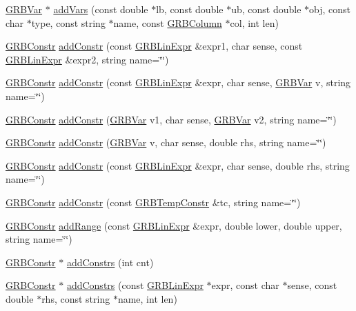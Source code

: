 \begin{DoxyCompactItemize}
\hyperlink{classGRBVar}{G\+R\+B\+Var} $\ast$ \hyperlink{classGRBModel_af8a3a9fc35892c314be155e243601192}{add\+Vars} (const double $\ast$lb, const double $\ast$ub, const double $\ast$obj, const char $\ast$type, const string $\ast$name, const \hyperlink{classGRBColumn}{G\+R\+B\+Column} $\ast$col, int len)
\item 
\hyperlink{classGRBConstr}{G\+R\+B\+Constr} \hyperlink{classGRBModel_a95e9bc35355e800ebdf87ba618153d27}{add\+Constr} (const \hyperlink{classGRBLinExpr}{G\+R\+B\+Lin\+Expr} \&expr1, char sense, const \hyperlink{classGRBLinExpr}{G\+R\+B\+Lin\+Expr} \&expr2, string name=\char`\"{}\char`\"{})
\item 
\hyperlink{classGRBConstr}{G\+R\+B\+Constr} \hyperlink{classGRBModel_a3605e2d163ba6ca2fc31586874b057f3}{add\+Constr} (const \hyperlink{classGRBLinExpr}{G\+R\+B\+Lin\+Expr} \&expr, char sense, \hyperlink{classGRBVar}{G\+R\+B\+Var} v, string name=\char`\"{}\char`\"{})
\item 
\hyperlink{classGRBConstr}{G\+R\+B\+Constr} \hyperlink{classGRBModel_a245f9547c916fa83d65e91863c5f10cd}{add\+Constr} (\hyperlink{classGRBVar}{G\+R\+B\+Var} v1, char sense, \hyperlink{classGRBVar}{G\+R\+B\+Var} v2, string name=\char`\"{}\char`\"{})
\item 
\hyperlink{classGRBConstr}{G\+R\+B\+Constr} \hyperlink{classGRBModel_abb54387d2110a52ad5bbe14c92c0f077}{add\+Constr} (\hyperlink{classGRBVar}{G\+R\+B\+Var} v, char sense, double rhs, string name=\char`\"{}\char`\"{})
\item 
\hyperlink{classGRBConstr}{G\+R\+B\+Constr} \hyperlink{classGRBModel_a3bba6ea074b2b285092f965adc4ade63}{add\+Constr} (const \hyperlink{classGRBLinExpr}{G\+R\+B\+Lin\+Expr} \&expr, char sense, double rhs, string name=\char`\"{}\char`\"{})
\item 
\hyperlink{classGRBConstr}{G\+R\+B\+Constr} \hyperlink{classGRBModel_ab5db9d63232f37b13834e0fbd5ea665c}{add\+Constr} (const \hyperlink{classGRBTempConstr}{G\+R\+B\+Temp\+Constr} \&tc, string name=\char`\"{}\char`\"{})
\item 
\hyperlink{classGRBConstr}{G\+R\+B\+Constr} \hyperlink{classGRBModel_a8d7c5b467a6f17c130a5c51a33051d08}{add\+Range} (const \hyperlink{classGRBLinExpr}{G\+R\+B\+Lin\+Expr} \&expr, double lower, double upper, string name=\char`\"{}\char`\"{})
\item 
\hyperlink{classGRBConstr}{G\+R\+B\+Constr} $\ast$ \hyperlink{classGRBModel_a648968e99d4f92774f28fea67719b393}{add\+Constrs} (int cnt)
\item 
\hyperlink{classGRBConstr}{G\+R\+B\+Constr} $\ast$ \hyperlink{classGRBModel_a89c52e6cbb11932bafd3a79dfee7d6bd}{add\+Constrs} (const \hyperlink{classGRBLinExpr}{G\+R\+B\+Lin\+Expr} $\ast$expr, const char $\ast$sense, const double $\ast$rhs, const string $\ast$name, int len)

\end{DoxyCompactItemize}
